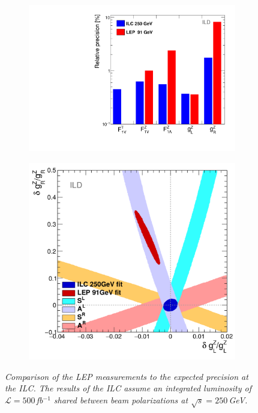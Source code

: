 \documentclass{PoS}
\begin{document}
\begin{figure}
	\centering
	\begin{subfigure}{0.5\textwidth}
		\includegraphics[width=0.95\linewidth]{../poster/plots/final-graph-ild.pdf}
		\caption{\label{fig:LEPILCResult_3_a} }
	\end{subfigure}%
	\begin{subfigure}{0.5\textwidth}
		\centering
		\includegraphics[width=0.95\linewidth]{../poster/plots/ilc-precision-ild.png}
		\caption{\label{fig:LEPILCResult_3_b} }
	\end{subfigure}
	\caption{\sl  Comparison of the LEP measurements to the expected precision at the ILC. The results of the ILC assume an integrated luminosity of $\mathcal{L} = 500$\,fb$^{-1}$ shared between beam polarizations at $\sqrt{s} = 250$\,GeV. }
	\label{fig:LEPILCResult_3}
\end{figure}
\end{document}
